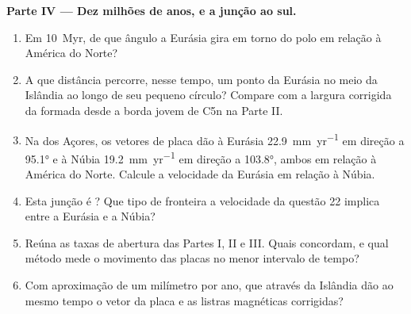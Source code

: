 \begin{problem}
\noindent\textbf{Parte IV --- Dez milhões de anos, e a junção ao sul.}
\begin{enumerate}[resume]
  \item Em \qty{10}{Myr}, de que ângulo a Eurásia gira em torno do polo em relação à
        América do Norte?
  \item A que distância percorre, nesse tempo, um ponto da Eurásia no meio da Islândia ao longo de seu pequeno círculo? Compare com a largura corrigida da  formada desde a borda jovem de C5n na Parte II.
  \item Na  dos Açores, os vetores de placa dão à Eurásia
        \qty{22.9}{mm.yr^{-1}} em direção a \ang{95.1} e à Núbia
        \qty{19.2}{mm.yr^{-1}} em direção a \ang{103.8}, ambos em relação à
        América do Norte. Calcule a velocidade da Eurásia em relação à Núbia.
  \item Esta junção é ? Que tipo de fronteira a velocidade da
        questão 22 implica entre a Eurásia e a Núbia?
  \item Reúna as taxas de abertura das Partes I, II e III. Quais concordam, e qual método mede o movimento das placas no menor intervalo de tempo?
  \item Com aproximação de um milímetro por ano, que  através da Islândia dão ao mesmo tempo o vetor da placa e as listras magnéticas corrigidas?
\end{enumerate}
\end{problem}
